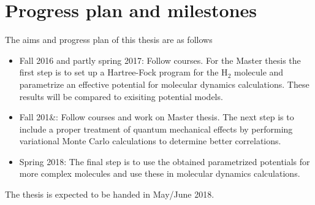 \documentclass[10pt]{article}
\begin{document}
\section*{Progress plan and milestones}
The aims and progress plan of this thesis are as follows
\begin{itemize}
\item Fall  2016 and partly spring 2017:  Follow courses. For the Master thesis the first step is to set up a Hartree-Fock program for the H$_2$ molecule and parametrize an effective potential for molecular dynamics calculations. These results will be compared to exisiting potential models.
\item Fall 201&:  Follow courses and work on Master thesis. The next step is to include a proper treatment of quantum mechanical effects by performing variational Monte Carlo calculations to determine better correlations.
\item Spring 2018: The final step is to use the obtained parametrized potentials for more complex molecules and use these
in molecular dynamics calculations.
\end{itemize}
 
The thesis is expected to be handed in May/June 2018.
\end{document}
